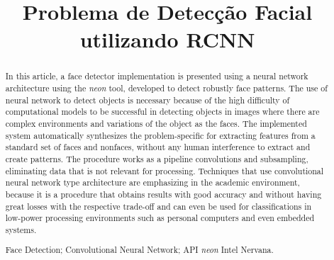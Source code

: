 \documentclass[10pt, conference]{IEEEtran}
\begin{document}
\title{Problema de Detecção Facial utilizando RCNN}

\newif\iffinal
\finaltrue
\newcommand{\jemsid}{99999}


\iffinal
  \author{%
  }
\else
  \author{Sibgrapi paper ID: \jemsid \\ }
\fi

\maketitle



\begin{abstract}
	In this article, a face detector implementation is presented using a neural network architecture using the \textit{neon} tool, developed to detect robustly face patterns. The use of neural network to detect objects is necessary because of the high difficulty of computational models to be successful in detecting objects in images where there are complex environments and variations of the object as the faces. The implemented system automatically synthesizes the problem-specific for extracting features from a standard set of faces and nonfaces, without any human interference to extract and create patterns. The procedure works as a pipeline convolutions and subsampling, eliminating data that is not relevant for processing. Techniques that use convolutional neural network type architecture are emphasizing in the academic environment, because it is a procedure that obtains results with good accuracy and without having great losses with the respective trade-off and can even be used for classifications in low-power processing environments such as personal computers and even embedded systems.

	\begin{IEEEkeywords}
		Face Detection; Convolutional Neural Network; API \textit{neon} Intel Nervana.
	\end{IEEEkeywords}
\end{abstract}
\end{document}
